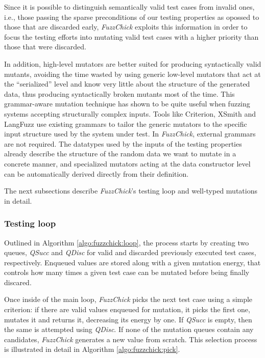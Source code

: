 \documentclass[acmsmall, anonymous]{acmart}
\newcommand{\fuzzchick}{\textit{FuzzChick}\xspace}
\begin{document}
Since it is possible to distinguish semantically valid test cases from invalid
ones, i.e., those passing the sparse preconditions of our testing properties as
opossed to those that are discarded early, \fuzzchick exploits this information
in order to focus the testing efforts into mutating valid test cases with a
higher priority than those that were discarded.


In addition, high-level mutators are better suited for producing syntactically
valid mutants, avoiding the time wasted by using generic low-level mutators that
act at the ``serialized'' level and know very little about the structure of the
generated data, thus producing syntactically broken mutants most of the time.
%
This grammar-aware mutation technique has shown to be quite useful when fuzzing
systems accepting structurally complex inputs.
%
Tools like Criterion, XSmith and LangFuzz use existing grammars to tailor the
generic mutators to the specific input structure used by the system under test.
%
In \fuzzchick, external grammars are not required.
%
The datatypes used by the inputs of the testing properties already describe the
structure of the random data we want to mutate in a concrete manner, and
specialized mutators acting at the data constructor level can be automatically
derived directly from their definition.

The next subsections describe \fuzzchick's testing loop and well-typed mutations
in detail.

\subsubsection{Testing loop}

Outlined in Algorithm \ref{algo:fuzzchick:loop}, the process starts by creating
two queues, \textit{QSucc} and \textit{QDisc} for valid and discarded previously
executed test cases, respectively.
%
Enqueued values are stored along with a given mutation energy, that controls how
many times a given test case can be mutated before being finally discared.


Once inside of the main loop, \fuzzchick picks the next test case using a simple
criterion: if there are valid values enqueued for mutation, it picks the first
one, mutates it and returns it, decreasing its energy by one.
%
If \textit{QSucc} is empty, then the same is attempted using \textit{QDisc}.
%
If none of the mutation queues contain any candidates, \fuzzchick generates a
new value from scratch.
%
This selection process is illustrated in detail in Algorithm
\ref{algo:fuzzchick:pick}.
\end{document}
